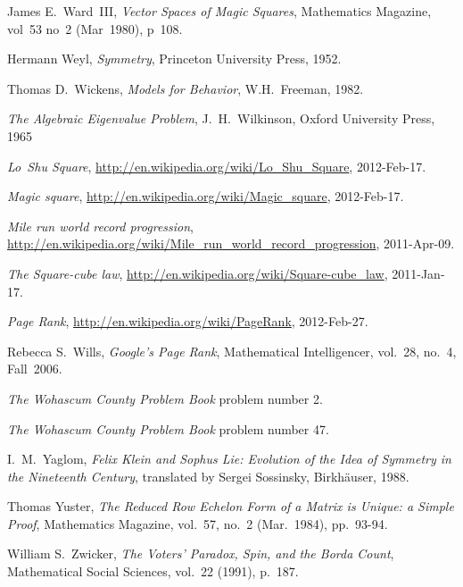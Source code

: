 \begin{thebibliography}{\makebox[2em][c]{{}\hfil{}}}
  James E.\ Ward~III,
  \emph{Vector Spaces of Magic Squares},
  Mathematics Magazine,
  vol~53 no~2 (Mar~1980),
  p~108.

  Hermann Weyl,
  \emph{Symmetry},
  Princeton University Press,
  1952.

  Thomas D.~Wickens,
  \emph{Models for Behavior},
  W.H.~Freeman,
  1982.

  \emph{The Algebraic Eigenvalue Problem},
  J.~H.~Wilkinson,
  Oxford University Press,
  1965

  \emph{Lo~Shu Square},
  \url{http://en.wikipedia.org/wiki/Lo_Shu_Square},
  2012-Feb-17.

  \emph{Magic square},
  \url{http://en.wikipedia.org/wiki/Magic_square},
  2012-Feb-17.

  \emph{Mile run world record progression},
  \url{http://en.wikipedia.org/wiki/Mile_run_world_record_progression},
  2011-Apr-09.

  \emph{The Square-cube law},
  \url{http://en.wikipedia.org/wiki/Square-cube_law},
  2011-Jan-17.

  \emph{Page Rank},
  \url{http://en.wikipedia.org/wiki/PageRank},
  2012-Feb-27.

  Rebecca S.~Wills,
  \emph{Google's Page Rank},
  Mathematical Intelligencer,
  vol.~28, no.~4, Fall~2006.

  \emph{The Wohascum County Problem Book}
  problem number 2.

  \emph{The Wohascum County Problem Book}
  problem number 47.

  I.\ M.~Yaglom,
  \emph{Felix Klein and Sophus Lie: Evolution of the Idea of
   Symmetry in the Nineteenth Century},
  translated by Sergei Sossinsky,
  Birkh\"auser,
  1988.

  Thomas Yuster,
  \emph{The Reduced Row Echelon Form of a Matrix is Unique: a Simple Proof},
  Mathematics Magazine,
  vol.~57, no.~2 (Mar.~1984),
  pp.~93-94.

  William S.~Zwicker,
  \emph{The Voters' Paradox, Spin, and the Borda Count},
  Mathematical Social Sciences,
  vol.~22 (1991),
  p.~187. 

\end{thebibliography}
